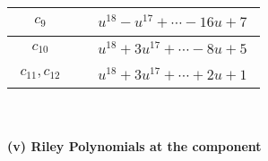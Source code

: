 \documentclass[1p]{elsarticle_modified}
\theoremstyle{definition}
\begin{document}
\begin{tabular}{m{50pt}|m{274pt}}
\hline $$\begin{aligned}c_{9}\end{aligned}$$&$\begin{aligned}
&u^{18}- u^{17}+\cdots-16 u+7
\end{aligned}$\\
\hline $$\begin{aligned}c_{10}\end{aligned}$$&$\begin{aligned}
&u^{18}+3 u^{17}+\cdots-8 u+5
\end{aligned}$\\
\hline $$\begin{aligned}c_{11},c_{12}\end{aligned}$$&$\begin{aligned}
&u^{18}+3 u^{17}+\cdots+2 u+1
\end{aligned}$\\
\hline
\end{tabular}\\~\\
\newpage\renewcommand{\arraystretch}{1}
\flushleft \textbf{(v) Riley Polynomials at the component}\newline \\
\end{document}
